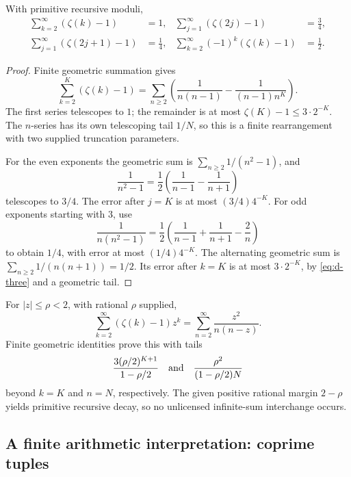 \begin{theorem}\label{thm:d-zeta-sums}
With primitive recursive moduli,
\[
\begin{aligned}
 \sum_{k=2}^{\infty}(\zeta(k)-1)&=1,&
 \sum_{j=1}^{\infty}(\zeta(2j)-1)&=\tfrac34,\\
 \sum_{j=1}^{\infty}(\zeta(2j+1)-1)&=\tfrac14,&
 \sum_{k=2}^{\infty}(-1)^k(\zeta(k)-1)&=\tfrac12.
\end{aligned}                                                   \tag{D27}\label{eq:d-zeta-sums}
\]
\end{theorem}
\begin{proof}
Finite geometric summation gives
\[
 \sum_{k=2}^K(\zeta(k)-1)
  =\sum_{n\geq2}\left(\frac1{n(n-1)}-\frac1{(n-1)n^K}\right).
\]
The first series telescopes to \(1\); the remainder is at most
\(\zeta(K)-1\leq3\cdot2^{-K}\).
The \(n\)-series has its own telescoping tail \(1/N\), so this is a
finite rearrangement with two supplied truncation parameters.

For the even exponents the geometric sum is
\(\sum_{n\geq2}1/(n^2-1)\), and
\[
 \frac1{n^2-1}=\frac12\left(\frac1{n-1}-\frac1{n+1}\right)
\]
telescopes to \(3/4\). The error after \(j=K\) is at most
\((3/4)4^{-K}\).
For odd exponents starting with \(3\), use
\[
 \frac1{n(n^2-1)}
   =\frac12\left(\frac1{n-1}+\frac1{n+1}-\frac2n\right)
\]
to obtain \(1/4\), with error at most \((1/4)4^{-K}\).
The alternating geometric sum is
\(\sum_{n\geq2}1/(n(n+1))=1/2\). Its error after \(k=K\) is at most
\(3\cdot2^{-K}\), by \eqref{eq:d-three} and a geometric tail.
\end{proof}

For \(|z|\leq\rho<2\), with rational \(\rho\) supplied,
\[
 \sum_{k=2}^{\infty}(\zeta(k)-1)z^k
       =\sum_{n=2}^{\infty}\frac{z^2}{n(n-z)}.          \tag{D28}\label{eq:d-generating}
\]
Finite geometric identities prove this with tails
\[
 \frac{3(\rho/2)^{K+1}}{1-\rho/2}\quad\hbox{and}\quad
 \frac{\rho^2}{(1-\rho/2)N}
\]
beyond \(k=K\) and \(n=N\), respectively.
The given positive rational margin \(2-\rho\) yields primitive
recursive decay, so no unlicensed infinite-sum interchange occurs.

\subsection{A finite arithmetic interpretation: coprime tuples}

